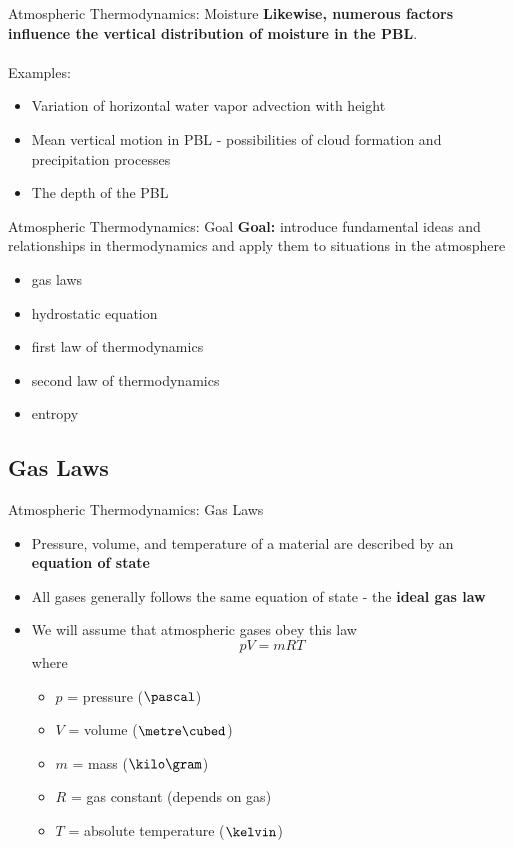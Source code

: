 \begin{frame}{Atmospheric Thermodynamics: Moisture}
\textbf{Likewise, numerous factors influence the vertical distribution of moisture in the PBL}. ~\\~\\
Examples:
\begin{itemize}
	\item Variation of horizontal water vapor advection with height
	\item Mean vertical motion in PBL - possibilities of cloud formation and precipitation processes
	\item The depth of the PBL
\end{itemize}
\end{frame}


\begin{frame}{Atmospheric Thermodynamics: Goal}
\textbf{Goal:} introduce fundamental ideas and relationships in thermodynamics and apply them to situations in the atmosphere
\begin{itemize}
	\item gas laws
	\item hydrostatic equation
	\item first law of thermodynamics
	\item second law of thermodynamics
	\item entropy
\end{itemize}
\end{frame}

\subsection{Gas Laws}
\begin{frame}{Atmospheric Thermodynamics: Gas Laws}
\begin{itemize}
	\item Pressure, volume, and temperature of a material are described by an \textbf{equation of state}
	\item All gases generally follows the same equation of state - the \textbf{ideal gas law}
	\item We will assume that atmospheric gases obey this law
	$$pV = mRT$$ where
	\begin{itemize}
		\item $p$ = pressure ($\pascal$)
		\item $V$ = volume ($\metre\cubed$)
		\item $m$ = mass ($\kilo\gram$)
		\item $R$ = gas constant (depends on gas)
		\item $T$ = absolute temperature ($\kelvin$)
	\end{itemize}
\end{itemize}
\end{frame}

